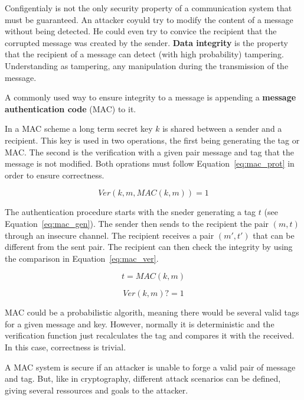 Configentialy is not the only security property of a communication system that must be guaranteed.
An attacker coyuld try to modify the content of a message without being detected.
He could even try to convice the recipient that the corrupted message was created by the sender.
\textbf{Data integrity} is the property that the recipient of a message can detect (with high probability) tampering.
Understanding as tampering, any manipulation during the transmission of the message.

A commonly used way to ensure integrity to a message is appending a \textbf{message authentication code} (MAC) to it.

In a MAC scheme a long term secret key $k$ is shared between a sender and a recipient.
This key is used in two operations, the first being generating the tag or MAC.
The second is the verification with a given pair message and tag that the message is not modified.
Both oprations must follow Equation~\ref{eq:mac_prot} in order to ensure correctness.

\begin{equation}
  Ver(k, m, MAC(k, m)) = 1
  \label{eq:mac_prop}
\end{equation}

The authentication procedure starts with the sneder generating a tag $t$ (see Equation~\ref{eq:mac_gen}).
The sender then sends to the recipient the pair $(m, t)$ through an insecure channel.
The recipient receives a pair $(m', t')$ that can be different from the sent pair.
The recipient can then check the integrity by using the comparison in Equation~\ref{eq:mac_ver}.

\begin{equation}
  t = MAC(k, m)
  \label{eq:mac_gen}
\end{equation}

\begin{equation}
  Ver(k, m) ?= 1
  \label{eq:mac_ver}
\end{equation}

MAC could be a probabilistic algorith, meaning there would be several valid tags for a given message and key.
However, normally it is deterministic and the verification function just recalculates the tag and compares it with the received.
In this case, correctness is trivial.

A MAC system is secure if an attacker is unable to forge a valid pair of message and tag.
But, like in cryptography, different attack scenarios can be defined, giving several ressources and goals to the attacker.


